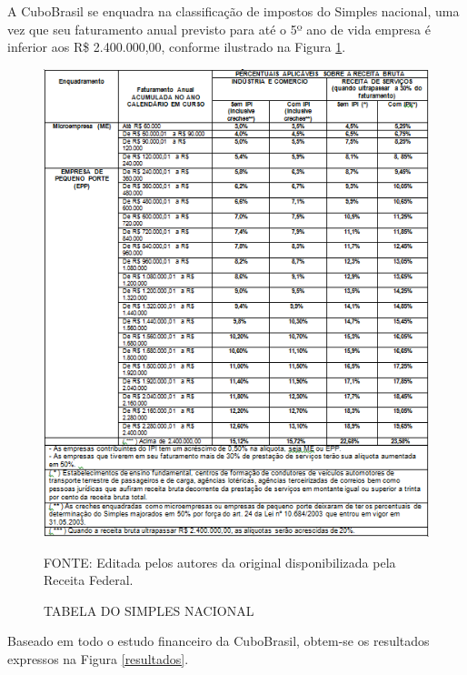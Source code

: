 \documentclass[
	12pt,				%
	openright,			%
	oneside,			%
	a4paper,			%
	english,			%
	french,				%
	spanish,			%
	brazil				%
	]{abntex2}
\begin{document}
	A CuboBrasil se enquadra na classificação de impostos do Simples nacional, uma vez que seu faturamento anual previsto para até o 5º ano de vida empresa é inferior aos R\$ 2.400.000,00, conforme ilustrado na Figura \ref{simples}.
	
	\begin{figure}[th]
		\caption{TABELA DO SIMPLES NACIONAL}
		\label{simples}
		\centering
		\includegraphics[width=0.8\linewidth]{./figs/simples}
		
		\begin{small}
			FONTE: Editada pelos autores da original disponibilizada pela Receita Federal.
		\end{small}
	\end{figure}
	\pagebreak
	
	Baseado em todo o estudo financeiro da CuboBrasil, obtem-se os resultados expressos na Figura \ref{resultados}.
	
\end{document}
